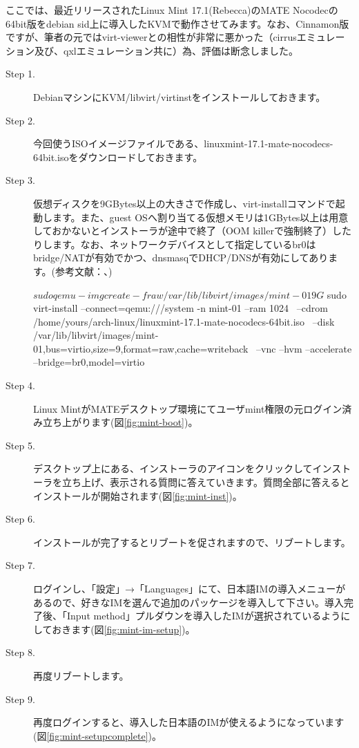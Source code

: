 \documentclass[mingoth,a4paper]{jsarticle}
\begin{document}
ここでは、最近リリースされたLinux Mint 17.1(Rebecca)のMATE Nocodecの64bit版をdebian sid上に導入したKVMで動作させてみます。なお、Cinnamon版ですが、筆者の元ではvirt-viewerとの相性が非常に悪かった（cirrusエミュレーション及び、qxlエミュレーション共に）為、評価は断念しました。

\begin{description}
\item [Step 1.] DebianマシンにKVM/libvirt/virtinstをインストールしておきます。
\item [Step 2.] 今回使うISOイメージファイルである、linuxmint-17.1-mate-nocodecs-64bit.isoをダウンロードしておきます。
\item [Step 3.] 仮想ディスクを9GBytes以上の大きさで作成し、virt-installコマンドで起動します。また、guest OSへ割り当てる仮想メモリは1GBytes以上は用意しておかないとインストーラが途中で終了（OOM killerで強制終了）したりします。なお、ネットワークデバイスとして指定しているbr0はbridge/NATが有効でかつ、dnsmasqでDHCP/DNSが有効にしてあります。(参考文献：\cite{ref:kde-devel-debian}、\cite{ref:dnsmasq})
     \begin{commandline}
$ sudo qemu-img create -f raw /var/lib/libvirt/images/mint-01 9G
$ sudo virt-install --connect=qemu:///system -n mint-01 --ram 1024 \
     --cdrom /home/yours/arch-linux/linuxmint-17.1-mate-nocodecs-64bit.iso \
     --disk /var/lib/libvirt/images/mint-01,bus=virtio,size=9,format=raw,cache=writeback \
     --vnc --hvm --accelerate --bridge=br0,model=virtio
   \end{commandline}
   \item [Step 4.] Linux MintがMATEデスクトップ環境にてユーザmint権限の元ログイン済み立ち上がります(図\ref{fig:mint-boot})。
   \item [Step 5.] デスクトップ上にある、インストーラのアイコンをクリックしてインストーラを立ち上げ、表示される質問に答えていきます。質問全部に答えるとインストールが開始されます(図\ref{fig:mint-inst})。
   \item [Step 6.] インストールが完了するとリブートを促されますので、リブートします。
   \item [Step 7.] ログインし、「設定」→「Languages」にて、日本語IMの導入メニューがあるので、好きなIMを選んで追加のパッケージを導入して下さい。導入完了後、「Input method」プルダウンを導入したIMが選択されているようにしておきます(図\ref{fig:mint-im-setup})。
   \item [Step 8.] 再度リブートします。
   \item [Step 9.] 再度ログインすると、導入した日本語のIMが使えるようになっています(図\ref{fig:mint-setupcomplete})。
\end{description}
\end{document}
